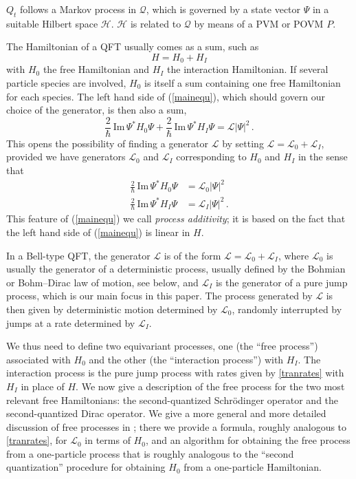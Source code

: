 \documentclass[12pt]{article}
\newcommand{\1}{\mathbf{1}} %
\renewcommand{\Im}{\mathrm{Im}} %
\newcommand{\Hilbert}{\mathscr{H}}
\newcommand{\conf}{\mathcal{Q}} %
\newcommand{\generator}{\mathscr{L}} %
\newcommand{\pov}{{P}}%
\newcommand{\inter}{{I}} %
\begin{document}
$Q_t$ follows a Markov process in $\conf$, which is governed by a
state vector $\Psi$ in a suitable Hilbert space $\Hilbert$.
$\Hilbert$ is related to $\conf$ by means of a PVM or POVM $\pov$.

The Hamiltonian of a QFT usually comes as a sum, such as
\begin{equation}\label{Hsum}
  H = H_0 + H_\inter
\end{equation}
with $H_0$ the free Hamiltonian and $H_\inter$ the interaction
Hamiltonian. If several particle species are involved, $H_0$ is itself
a sum containing one free Hamiltonian for each species. The left hand
side of (\ref{mainequ}), which should govern our choice of the
generator, is then also a sum,
\begin{equation}\label{Hsumgen}
  \frac{2}{\hbar} \, \Im \, \Psi^* H_0 \Psi + \frac{2}{\hbar} \, \Im
  \, \Psi^* H_\inter \Psi = \generator |\Psi|^2\,.
\end{equation}
This opens the possibility of finding a generator $\generator$ by
setting $\generator = \generator_0 + \generator_\inter$, provided we
have generators $\generator_0$ and $\generator_\inter$
corresponding to $H_0$ and $H_\inter$ in the sense that
\begin{subequations}
\begin{align}
  \frac{2}{\hbar} \, \Im \, \Psi^* H_0 \Psi
  &= \generator_0 |\Psi|^2 \\
  \frac{2}{\hbar} \, \Im \, \Psi^* H_\inter \Psi
  &= \generator_\inter |\Psi|^2\,.
\end{align}
\end{subequations}
This feature of (\ref{mainequ}) we call \emph{process additivity}; it
is based on the fact that the left hand side of (\ref{mainequ}) is
linear in $H$.

In a Bell-type QFT, the generator $\generator$ is of the form
$\generator = \generator_0 + \generator_I$, where $\generator_0$ is
usually the generator of a deterministic process, usually defined by
the Bohmian or Bohm--Dirac law of motion, see below, and
$\generator_I$ is the generator of a pure jump process, which is our
main focus in this paper.  The process generated by $\generator$ is
then given by deterministic motion determined by $\generator_0$,
randomly interrupted by jumps at a rate determined by $\generator_I$.

We thus need to define two equivariant processes, one (the ``free
process'') associated with $H_0$ and the other (the ``interaction
process'') with $H_I$. The interaction process is the pure jump
process with rates given by \eqref{tranrates} with $H_I$ in place
of $H$.  We now give a description of the free process for the two
most relevant free Hamiltonians: the second-quantized Schr\"odinger
operator and the second-quantized Dirac operator. We give a more
general and more detailed discussion of free processes in
\cite{crea2B}; there we provide a formula, roughly analogous to
\eqref{tranrates}, for $\generator_0$ in terms of $H_0$, and an
algorithm for obtaining the free process from a one-particle process
that is roughly analogous to the ``second quantization'' procedure for
obtaining $H_0$ from a one-particle Hamiltonian.
\end{document}
